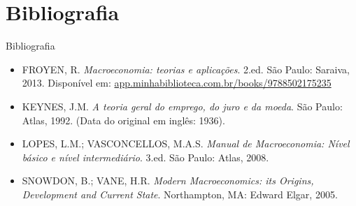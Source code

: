 \documentclass[10pt]{beamer}
\begin{document}
\section{Bibliografia}
\begin{frame}{Bibliografia }
    \begin{itemize}
        \item FROYEN, R. \emph{Macroeconomia: teorias e aplicações}. 2.ed. São Paulo: Saraiva, 2013. Disponível em: \href{https://app.minhabiblioteca.com.br/books/9788502175235}{app.minhabiblioteca.com.br/books/9788502175235}\medskip
        \item KEYNES, J.M. \emph{A teoria geral do emprego, do juro e da moeda}. São Paulo: Atlas, 1992. (Data do original em inglês: 1936).\medskip
        \item LOPES, L.M.; VASCONCELLOS, M.A.S. \emph{Manual de Macroeconomia: Nível básico e nível intermediário}. 3.ed. São Paulo: Atlas, 2008.\medskip
        \item SNOWDON, B.; VANE, H.R. \emph{Modern Macroeconomics: its Origins, Development and Current State}. Northampton, MA: Edward Elgar, 2005.
    \end{itemize}
\end{frame}
\end{document}
